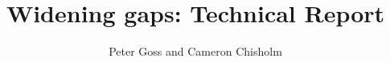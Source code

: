 \documentclass{grattan}
\title{Widening gaps: Technical Report}
\author{Peter Goss and Cameron Chisholm}
\begin{document}


\contentspage


\begin{appendix}










\end{appendix}

\begin{footnotesize}
\printbibliography
\end{footnotesize}
\end{document}
